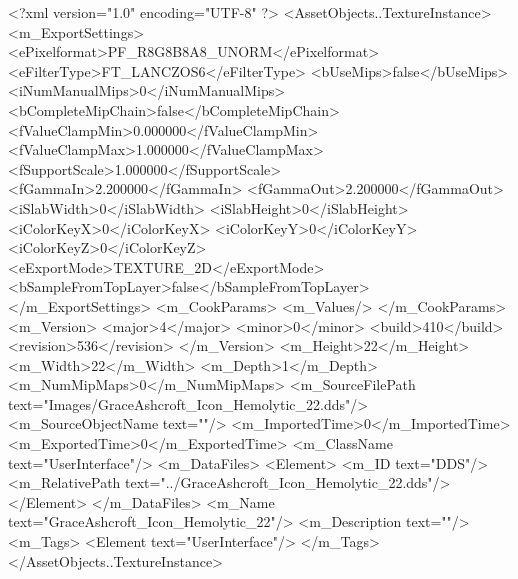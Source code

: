 <?xml version="1.0" encoding="UTF-8" ?>
<AssetObjects..TextureInstance>
	<m_ExportSettings>
		<ePixelformat>PF_R8G8B8A8_UNORM</ePixelformat>
		<eFilterType>FT_LANCZOS6</eFilterType>
		<bUseMips>false</bUseMips>
		<iNumManualMips>0</iNumManualMips>
		<bCompleteMipChain>false</bCompleteMipChain>
		<fValueClampMin>0.000000</fValueClampMin>
		<fValueClampMax>1.000000</fValueClampMax>
		<fSupportScale>1.000000</fSupportScale>
		<fGammaIn>2.200000</fGammaIn>
		<fGammaOut>2.200000</fGammaOut>
		<iSlabWidth>0</iSlabWidth>
		<iSlabHeight>0</iSlabHeight>
		<iColorKeyX>0</iColorKeyX>
		<iColorKeyY>0</iColorKeyY>
		<iColorKeyZ>0</iColorKeyZ>
		<eExportMode>TEXTURE_2D</eExportMode>
		<bSampleFromTopLayer>false</bSampleFromTopLayer>
	</m_ExportSettings>
	<m_CookParams>
		<m_Values/>
	</m_CookParams>
	<m_Version>
		<major>4</major>
		<minor>0</minor>
		<build>410</build>
		<revision>536</revision>
	</m_Version>
	<m_Height>22</m_Height>
	<m_Width>22</m_Width>
	<m_Depth>1</m_Depth>
	<m_NumMipMaps>0</m_NumMipMaps>
	<m_SourceFilePath text="Images/GraceAshcroft_Icon_Hemolytic_22.dds"/>
	<m_SourceObjectName text=""/>
	<m_ImportedTime>0</m_ImportedTime>
	<m_ExportedTime>0</m_ExportedTime>
	<m_ClassName text="UserInterface"/>
	<m_DataFiles>
		<Element>
			<m_ID text="DDS"/>
			<m_RelativePath text="../GraceAshcroft_Icon_Hemolytic_22.dds"/>
		</Element>
	</m_DataFiles>
	<m_Name text="GraceAshcroft_Icon_Hemolytic_22"/>
	<m_Description text=""/>
	<m_Tags>
		<Element text="UserInterface"/>
	</m_Tags>
</AssetObjects..TextureInstance>
